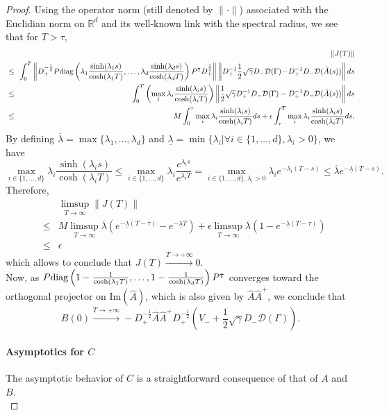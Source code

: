 \documentclass[preprint, 3p]{elsarticle}
\newcommand{\1}{{\chi}}
\begin{document}
\begin{proof}
Using the operator norm (still denoted by $\|\cdot\|$) associated with the
Euclidian norm on $\mathbb{R}^d$ and its well-known link with the spectral
radius, we see that for $T > \tau$,
\begin{eqnarray*}
 \!\!&&\|J(T)\|\\
 \!\!&\le&\!\!  \int_0^T \left\|D_+^{-\frac 12} P \textup{diag}\left(\lambda_1 \frac{\sinh(\lambda_1 s)}{\cosh(\lambda_1 T)}, \ldots, \lambda_d \frac{\sinh(\lambda_d s)}{\cosh(\lambda_d T)}\right) P^\intercal D_+^{\frac 12}\right\| \left\|D_+^{-1}\frac 12 \sqrt{\gamma} D_- \mathcal D(\Gamma)\! -\! D_+^{-1}D_- \mathcal D(\tilde A(s))\right\| ds\\
\!\!&\le&\!\! \int_0^T \left(\max_i \lambda_i \frac{\sinh(\lambda_i s)}{\cosh(\lambda_i T)}\right)\left\|\frac 12 \sqrt{\gamma} D_+^{-1}D_- \mathcal D(\Gamma) - D_+^{-1}D_- \mathcal D(\tilde A(s))\right\| ds\\
&\le& M \int_0^\tau \max_i \lambda_i \frac{\sinh(\lambda_i s)}{\cosh(\lambda_i T)}ds + \epsilon \int_\tau^T \max_i \lambda_i \frac{\sinh(\lambda_i s)}{\cosh(\lambda_i T)}ds.\\
\end{eqnarray*}
By defining $\overline{\lambda} = \max\{\lambda_1,
\ldots, \lambda_d\}$ and $\underline{\lambda} = \min\{\lambda_i | \forall i \in \{1, \ldots, d\}, \lambda_i > 0\}$, we have
$$\max_{i \in \{1, \ldots, d\}} \lambda_i \frac{\sinh(\lambda_i s)}{\cosh(\lambda_i T)} \le \max_{i \in \{1, \ldots, d\}} \lambda_i \frac{e^{\lambda_i s}}{e^{\lambda_i T}} =  \max_{i \in \{1, \ldots, d\}, \lambda_i > 0}  \lambda_i e^{-\lambda_i (T-s)} \le \overline{\lambda}  e^{-\underline{\lambda} (T-s)}.$$
Therefore,
\begin{eqnarray*}
&&\limsup_{T \to \infty} \|J(T)\|\\
&\le& M \limsup_{T \to \infty} \overline{\lambda} \left(e^{-\underline{\lambda} (T-\tau)} - e^{-\underline{\lambda} T}\right)
    + \epsilon \limsup_{T \to \infty} \overline{\lambda} \left(1 - e^{-\underline{\lambda} (T -\tau)}\right)\\
&\le& \epsilon
\end{eqnarray*}
which allows to conclude that $J(T) \stackrel{T \to +\infty}{\longrightarrow} 0$.\\

Now, as $P \textup{diag}\left(1 - \frac{1}{\cosh(\lambda_1 T)}, \ldots, 1-
\frac{1}{\cosh(\lambda_d T)}\right) P^\intercal$ converges toward the
orthogonal projector on $\text{Im}(\widehat A)$, which is also
given by $\widehat{A}\widehat{A}^+$, we conclude that
$$ B(0) \stackrel{T\to+\infty}{\longrightarrow} - D_+^{-\frac 12} \widehat{A}\widehat{A}^+ D_+^{-\frac 12} \left(V_-
     + \frac{1}{2}\sqrt{\gamma} D_- \mathcal D(\Gamma)\right).$$

\paragraph{\textbf{Asymptotics for $C$}}

The asymptotic behavior of $C$ is a straightforward consequence of that of $A$ and $B$.\\
\end{proof}
\end{document}
